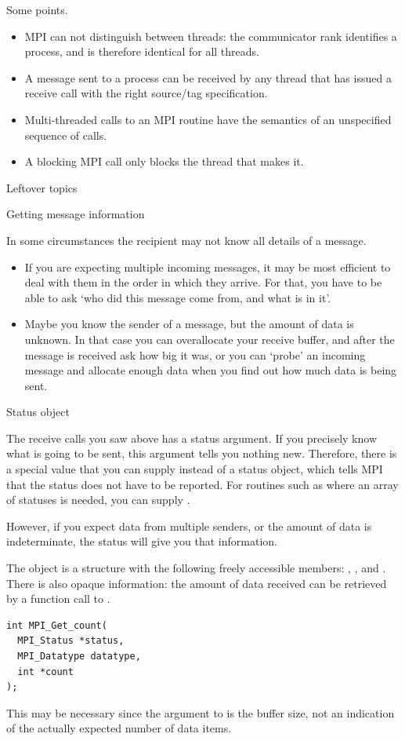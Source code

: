 Some points.
\begin{itemize}
\item MPI can not distinguish between threads: the communicator rank
  identifies a process, and is therefore identical for all threads.
\item A message sent to a process can be received by any thread that
  has issued a receive call with the right source/tag specification.
\item Multi-threaded calls to an MPI routine have the semantics of an
  unspecified sequence of calls.
\item A blocking MPI call only blocks the thread that makes it.
\end{itemize}

 {Leftover topics}

 {Getting message information}

In some circumstances the recipient may not know all details of a message.
\begin{itemize}
\item If you are expecting multiple incoming messages, it may be most
  efficient to deal with them in the order in which they arrive. For
  that, you have to be able to ask `who did this message come from,
  and what is in it'.
\item Maybe you know the sender of a message, but the amount of data
  is unknown. In that case you can overallocate your receive buffer,
  and after the message is received ask how big it was, or you can
  `probe' an incoming message and allocate enough data when you find
  out how much data is being sent.
\end{itemize}

 {Status object}

The receive calls you saw above has a status argument. If you 
precisely know what is going to be sent, this argument tells you 
nothing new. Therefore, there is a special value 
that you can supply instead of a status object, which tells MPI that the 
status does not have to be reported. For routines such as 
where an array of statuses is needed, you can supply .

However, if you expect data from multiple senders,
or the amount of data is indeterminate, the status will give
you that information.

The  object is a structure with the following 
freely accessible members:
, , and . There is also opaque 
information: the amount of data received can be retrieved by 
a function call to .
\begin{verbatim}
int MPI_Get_count(
  MPI_Status *status,
  MPI_Datatype datatype,
  int *count
);
\end{verbatim}
This may be necessary since the  argument to  is 
the buffer size, not an indication of the actually expected number of
data items.

